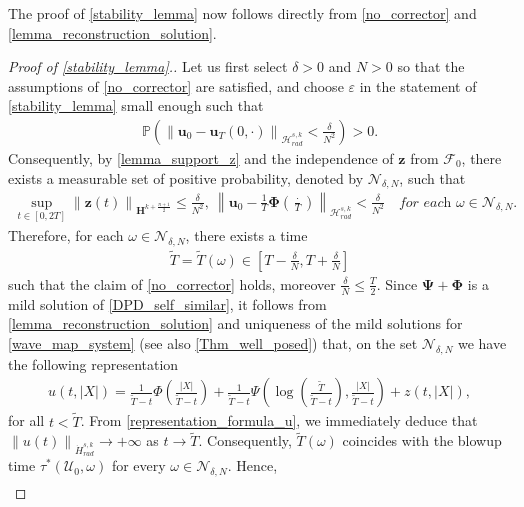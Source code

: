 \documentclass[12pt,reqno]{amsart}
\theoremstyle{plain}
\theoremstyle{remark}
\theoremstyle{plain}
\theoremstyle{definition}
\numberwithin{equation}{section}
\numberwithin{equation}{section}
\newcommand{\norm}[1]{\left\|#1\right\|}
\newcommand{\HH}{\mathcal{H}}
\begin{document}
	The proof of \autoref{stability_lemma} now follows directly from \autoref{no_corrector} and \autoref{lemma_reconstruction_solution}.
	\begin{proof}[Proof of \autoref{stability_lemma}.]
		Let us first select $\delta>0$ and $N>0$ so that the assumptions of \autoref{no_corrector} are satisfied, and choose $\varepsilon $ in the statement of \autoref{stability_lemma} small enough such that
		\begin{align*}
			\mathbb{P}\left(\norm{\mathbf{u}_0-\mathbf{u}_{T}(0,\cdot)}_{\HH_{rad}^{s,k}}< \frac{\delta}{N^2}\right)>0.   
		\end{align*}
		Consequently, by \autoref{lemma_support_z} and the independence of $\mathbf{z}$ from $\mathcal{F}_0$, there exists a measurable set of positive probability, denoted by $\mathcal{N}_{\delta,N}$, such that
		\begin{align*}
			\sup_{t\in [0,2T]}\norm{\mathbf{z}(t)}_{\mathbf{H}^{k+\frac{n+1}{2}}}\leq \frac{\delta}{N^2},\ \norm{\mathbf{u}_0-\frac{1}{T}\mathbf{\Phi}\left(\frac{\cdot}{T}\right)}_{\HH_{rad}^{s,k}}<\frac{\delta}{N^2} \quad \textit{for each }\omega\in \mathcal{N}_{\delta,N}.
		\end{align*}
		Therefore, for each $\omega\in \mathcal{N}_{\delta,N}$, there exists a time \begin{align*}
		    \tilde{T}=\tilde{T}(\omega)\in   \left[T-\frac{\delta}{N},T+\frac{\delta}{N}\right]
		\end{align*} such that the claim of \autoref{no_corrector} holds, moreover $\frac{\delta}{N}\leq \frac{T}{2} $. Since $\mathbf{\Psi}+\mathbf{\Phi}$ is a mild solution of \eqref{DPD_self_similar}, it follows from \autoref{lemma_reconstruction_solution} and uniqueness of the mild solutions for \eqref{wave_map_system} (see also \autoref{Thm_well_posed}) that, on the set $\mathcal{N}_{\delta,N}$ we have the following representation
        \begin{align}\label{representation_formula_u}
			u(t,\lvert X\rvert)=\frac{1}{\tilde{T}-t}\Phi\left(\frac{\lvert X\rvert}{\tilde{T}-t}\right)+\frac{1}{\tilde{T}-t}\Psi\left(\log\left(\frac{\tilde{T}}{\tilde{T}-t}\right),\frac{\lvert X\rvert}{\tilde{T}-t}\right)+ z(t,\lvert X\rvert),
		\end{align}
        for all $t<\tilde{T}$.
		From \eqref{representation_formula_u}, we immediately deduce that $\norm{u(t)}_{\dot{H}^{s,k}_{rad}} \to +\infty$ as $t \to \tilde{T}$. Consequently,  $\tilde{T}(\omega)$ coincides with the blowup time $\tau^*(\boldsymbol{\mathcal{U}}_0,\omega)$ for every $\omega\in \mathcal{N}_{\delta,N}.$ Hence, \begin{align*}

\end{align*}
\end{proof}
\end{document}
